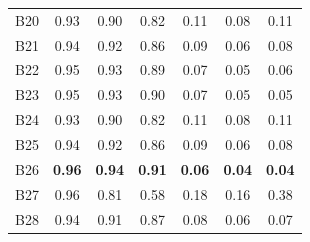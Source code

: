 \documentclass{article}
\theoremstyle{plain}
\theoremstyle{definition}
\theoremstyle{remark}
\begin{document}
\begin{table}[h!]
{\begin{tabular}{lcccccc}
      B20                      &
      0.93                     &
      0.90                     &
      0.82                     &
      0.11                     &
      0.08                     &
      0.11                            \\

      B21                      &
      0.94                     &
      0.92                     &
      0.86                     &
      0.09                     &
      0.06                     &
      0.08                            \\

      B22                      &
      0.95                     &
      0.93                     &
      0.89                     &
      0.07                     &
      0.05                     &
      0.06                            \\

      B23                      &
      0.95                     &
      0.93                     &
      0.90                     &
      0.07                     &
      0.05                     &
      0.05                            \\

      B24                      &
      0.93                     &
      0.90                     &
      0.82                     &
      0.11                     &
      0.08                     &
      0.11                            \\

      B25                      &
      0.94                     &
      0.92                     &
      0.86                     &
      0.09                     &
      0.06                     &
      0.08                            \\

      B26                      &
      \textbf{0.96}            &
      \textbf{0.94}            &
      \textbf{0.91}            &
      \textbf{0.06}            &
      \textbf{0.04}            &
      \textbf{0.04}                   \\

      B27                      &
      0.96                     &
      0.81                     &
      0.58                     &
      0.18                     &
      0.16                     &
      0.38                            \\

      B28                      &
      0.94                     &
      0.91                     &
      0.87                     &
      0.08                     &
      0.06                     &
      0.07                            \\


\end{tabular}}
\end{table}
\end{document}
